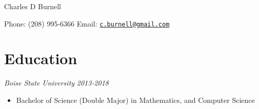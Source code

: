 \documentclass[letterpaper]{article}
\def\name{Charles D Burnell}
\def\goal{My goal is to be a software engineer to use my knowledge of math and statistics to develop new software tools using formal mathematics.}
\begin{document}
{\huge \name}
\vspace{.05in}\vspace{.05in}
\begin{multicols}{2}
Phone: (208) 995-6366
\vfill
\columnbreak
Email:  \href{mailto:c.burnell@gmail.com}{\tt c.burnell@gmail.com}
\end{multicols}

\vspace{.05in}
\section*{Education}
\begin{multicols}{2}
\textit{Boise State University}
\vfill
\columnbreak
\textit{2013-2018}
\end{multicols}


\begin{itemize}
\item Bachelor of Science (Double Major) in  Mathematics, and Computer Science


\end{itemize}
\end{document}
